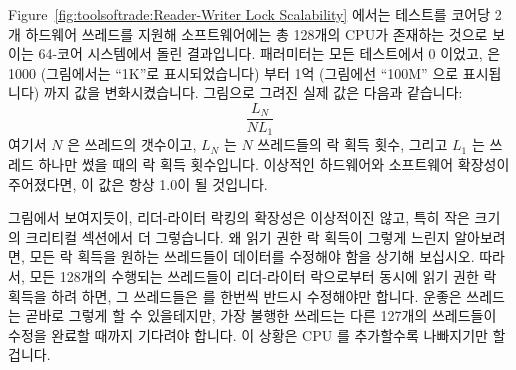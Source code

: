 Figure~\ref{fig:toolsoftrade:Reader-Writer Lock Scalability} 에서는 테스트를
코어당 2개 하드웨어 쓰레드를 지원해 소프트웨어에는 총 128개의 CPU가 존재하는
것으로 보이는 64-코어  시스템에서 돌린 결과입니다.
 패러미터는 모든 테스트에서 0 이었고,  은 1000
(그림에서는 ``1K''로 표시되었습니다) 부터 1억 (그림에선 ``100M'' 으로
표시됩니다) 까지 값을 변화시켰습니다.
그림으로 그려진 실제 값은 다음과 같습니다:
\begin{equation}
	\frac{L_N}{N L_1}
\end{equation}
여기서 $N$ 은 쓰레드의 갯수이고, $L_N$ 는 $N$ 쓰레드들의 락 획득 횟수, 그리고
$L_1$ 는 쓰레드 하나만 썼을 때의 락 획득 횟수입니다.
이상적인 하드웨어와 소프트웨어 확장성이 주어졌다면, 이 값은 항상 1.0이 될
것입니다.

그림에서 보여지듯이, 리더-라이터 락킹의 확장성은 이상적이진 않고, 특히 작은
크기의 크리티컬 섹션에서 더 그렇습니다.
왜 읽기 권한 락 획득이 그렇게 느린지 알아보려면, 모든 락 획득을 원하는
쓰레드들이  데이터를 수정해야 함을 상기해 보십시오.
따라서, 모든 128개의 수행되는 쓰레드들이 리더-라이터 락으로부터 동시에 읽기
권한 락 획득을 하려 하면, 그 쓰레드들은  를 한번씩 반드시
수정해야만 합니다.
운좋은 쓰레드는 곧바로 그렇게 할 수 있을테지만, 가장 불행한 쓰레드는 다른
127개의 쓰레드들이 수정을 완료할 때까지 기다려야 합니다.
이 상황은 CPU 를 추가할수록 나빠지기만 할 겁니다.

